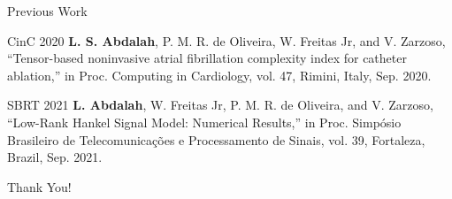 \documentclass{beamer}
\begin{document}
	\begin{frame}{Previous Work}
	
		\begin{block}{CinC 2020}
			\textbf{L. S. Abdalah}, P. M. R. de Oliveira, W. Freitas Jr, and V. Zarzoso, ``Tensor-based noninvasive atrial fibrillation complexity index for  catheter ablation,'' in Proc. Computing in Cardiology, vol. 47, Rimini, Italy, Sep. 2020.
		\end{block}

		\begin{block}{SBRT 2021}
			\textbf{L. Abdalah}, W. Freitas Jr, P. M. R. de Oliveira, and V. Zarzoso, ``Low-Rank Hankel Signal Model: Numerical Results,'' in Proc. Simp\'{o}sio Brasileiro de Telecomunica\c{c}\~{o}es e Processamento de Sinais, vol. 39, Fortaleza, Brazil, Sep. 2021.
		\end{block}
	
	\end{frame}
	
	\begin{frame}{}

		\begin{center}
			Thank You!
		\end{center}
	\end{frame}
\end{document}
